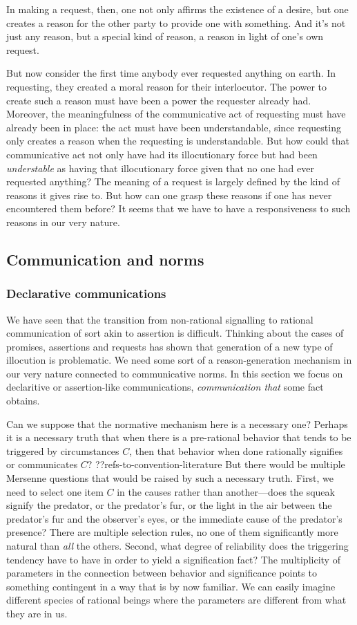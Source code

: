 In making a request, then, one not only affirms the existence of a desire, but one creates a reason for the other 
party to provide one with something. And it's not just any reason, but a special kind of reason, a reason in light of one's own request.

But now consider the first time anybody ever requested anything on earth. In requesting, they created a moral reason for their interlocutor. 
The power to create such a reason must have been a power the requester already had.  Moreover, the meaningfulness of 
the communicative act of requesting must have already been in place: the act must have been understandable, 
since requesting only creates a reason when the requesting is understandable. But how could that communicative act not only have had its illocutionary force but had been \textit{understable} as having that illocutionary 
force given that no one had ever requested anything? The meaning of a request is largely defined by the kind of reasons it gives
rise to. But how can one grasp these reasons if one has never encountered them before? It seems that we have to have
a responsiveness to such reasons in our very nature.

\subsection{Communication and norms}
\subsubsection{Declarative communications}
We have seen that the transition from non-rational signalling to rational communication of sort akin to assertion
is difficult. Thinking
about the cases of promises, assertions and requests has shown that generation of a new type of illocution is 
problematic. We need some sort of a reason-generation mechanism in our very nature connected to communicative
norms. In this section we focus on declaritive or assertion-like communications, \textit{communication that} some fact obtains.

Can we suppose that the normative mechanism here is a necessary one? Perhaps it is a necessary truth that when
there is a pre-rational behavior that tends to be triggered by circumstances $C$, then that behavior when done rationally
signifies or communicates $C$? ??refs-to-convention-literature 
But there would be multiple Mersenne questions that would be raised by such a necessary truth. First,
we need to select one item $C$ in the causes rather than another---does the squeak signify the predator, or the predator's fur, or the
light in the air between the predator's fur and the observer's eyes, or the immediate cause of the predator's presence? 
There are multiple selection rules, 
no one of them significantly more natural than \textit{all} the others. Second, what degree of reliability does the 
triggering tendency have to have in order to yield a signification fact? 
The multiplicity of parameters in the connection between behavior and
significance points to something contingent in a way that is by now familiar. 
We can easily imagine different species of rational beings where the parameters are
different from what they are in us. 

